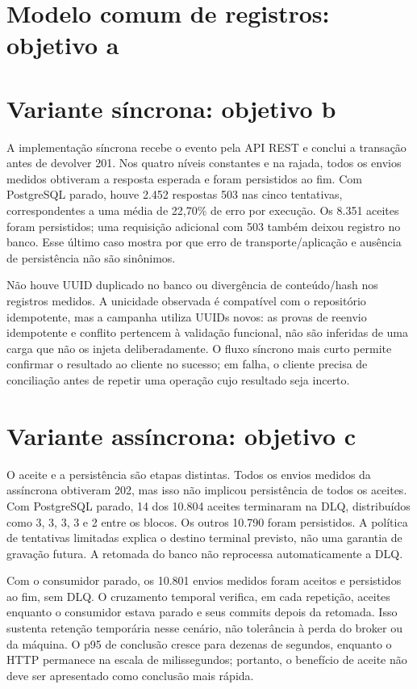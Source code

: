 \section{Modelo comum de registros: objetivo a}
\label{sec:resultado-modelo}


\section{Variante síncrona: objetivo b}
A implementação síncrona recebe o evento pela API REST e conclui a transação antes de devolver 201. Nos quatro níveis constantes e na rajada, todos os envios medidos obtiveram a resposta esperada e foram persistidos ao fim. Com PostgreSQL parado, houve 2.452 respostas 503 nas cinco tentativas, correspondentes a uma média de 22,70\% de erro por execução. Os 8.351 aceites foram persistidos; uma requisição adicional com 503 também deixou registro no banco. Esse último caso mostra por que erro de transporte/aplicação e ausência de persistência não são sinônimos.

Não houve UUID duplicado no banco ou divergência de conteúdo/hash nos registros medidos. A unicidade observada é compatível com o repositório idempotente, mas a campanha utiliza UUIDs novos: as provas de reenvio idempotente e conflito pertencem à validação funcional, não são inferidas de uma carga que não os injeta deliberadamente. O fluxo síncrono mais curto permite confirmar o resultado ao cliente no sucesso; em falha, o cliente precisa de conciliação antes de repetir uma operação cujo resultado seja incerto.

\section{Variante assíncrona: objetivo c}
O aceite e a persistência são etapas distintas. Todos os envios medidos da assíncrona obtiveram 202, mas isso não implicou persistência de todos os aceites. Com PostgreSQL parado, 14 dos 10.804 aceites terminaram na DLQ, distribuídos como 3, 3, 3, 3 e 2 entre os blocos. Os outros 10.790 foram persistidos. A política de tentativas limitadas explica o destino terminal previsto, não uma garantia de gravação futura. A retomada do banco não reprocessa automaticamente a DLQ.

Com o consumidor parado, os 10.801 envios medidos foram aceitos e persistidos ao fim, sem DLQ. O cruzamento temporal verifica, em cada repetição, aceites enquanto o consumidor estava parado e seus commits depois da retomada. Isso sustenta retenção temporária nesse cenário, não tolerância à perda do broker ou da máquina. O p95 de conclusão cresce para dezenas de segundos, enquanto o HTTP permanece na escala de milissegundos; portanto, o benefício de aceite não deve ser apresentado como conclusão mais rápida.

